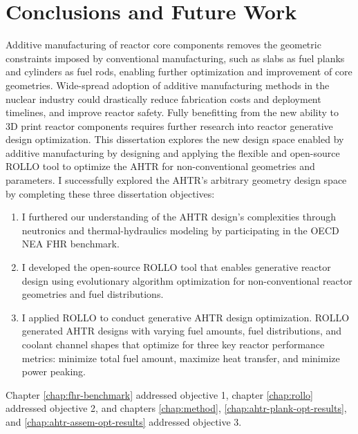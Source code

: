 \chapter{Conclusions and Future Work}
\glsresetall
\label{chap:concl}

Additive manufacturing of reactor core components removes the geometric constraints
imposed by conventional manufacturing, such as slabs as fuel planks and cylinders 
as fuel rods, enabling further optimization and improvement of core geometries. 
Wide-spread adoption of additive manufacturing methods in the nuclear industry
could drastically reduce fabrication costs and deployment timelines, and improve 
reactor safety. 
Fully benefitting from the new ability to 3D print reactor components requires further 
research into reactor generative design optimization. 
This dissertation explores the new design space enabled by additive manufacturing 
by designing and applying the flexible and open-source \gls{ROLLO} tool to optimize 
the \gls{AHTR} for non-conventional geometries and parameters. 
I successfully explored the \gls{AHTR}'s arbitrary geometry design space by completing 
these three dissertation objectives: 
\begin{enumerate}
    \item I furthered our understanding of the \gls{AHTR} design's complexities 
    through neutronics and thermal-hydraulics modeling by participating in the 
    \gls{OECD} \gls{NEA} \gls{FHR} benchmark.
    \item I developed the open-source \gls{ROLLO} tool that enables generative reactor 
    design using evolutionary algorithm optimization for non-conventional reactor 
    geometries and fuel distributions.
    \item I applied \gls{ROLLO} to conduct generative \gls{AHTR} design optimization.
    \gls{ROLLO} generated \gls{AHTR} designs with varying fuel amounts, fuel 
    distributions, and coolant channel shapes that optimize for three key reactor 
    performance metrics: minimize total fuel amount, maximize heat transfer, and 
    minimize power peaking.
\end{enumerate}
Chapter \ref{chap:fhr-benchmark} addressed objective 1, chapter \ref{chap:rollo} 
addressed objective 2, and chapters \ref{chap:method}, \ref{chap:ahtr-plank-opt-results}, 
and \ref{chap:ahtr-assem-opt-results} addressed objective 3. 

